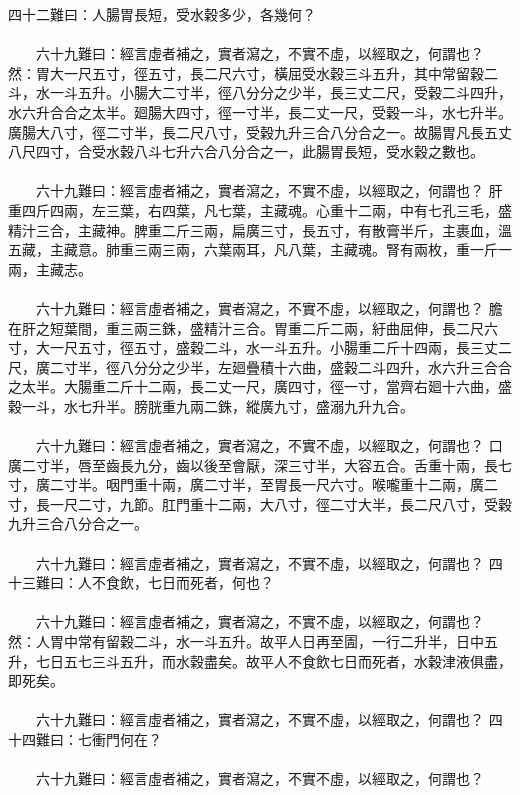 四十二難曰：人腸胃長短，受水穀多少，各幾何？
\\\\
　　六十九難曰：經言虛者補之，實者瀉之，不實不虛，以經取之，何謂也？
然：胃大一尺五寸，徑五寸，長二尺六寸，橫屈受水穀三斗五升，其中常留穀二斗，水一斗五升。小腸大二寸半，徑八分分之少半，長三丈二尺，受穀二斗四升，水六升合合之太半。廻腸大四寸，徑一寸半，長二丈一尺，受穀一斗，水七升半。廣腸大八寸，徑二寸半，長二尺八寸，受穀九升三合八分合之一。故腸胃凡長五丈八尺四寸，合受水穀八斗七升六合八分合之一，此腸胃長短，受水穀之數也。
\\\\
　　六十九難曰：經言虛者補之，實者瀉之，不實不虛，以經取之，何謂也？
肝重四斤四兩，左三葉，右四葉，凡七葉，主藏魂。心重十二兩，中有七孔三毛，盛精汁三合，主藏神。脾重二斤三兩，扁廣三寸，長五寸，有散膏半斤，主裹血，溫五藏，主藏意。肺重三兩三兩，六葉兩耳，凡八葉，主藏魂。腎有兩枚，重一斤一兩，主藏志。
\\\\
　　六十九難曰：經言虛者補之，實者瀉之，不實不虛，以經取之，何謂也？
膽在肝之短葉間，重三兩三銖，盛精汁三合。胃重二斤二兩，紆曲屈伸，長二尺六寸，大一尺五寸，徑五寸，盛穀二斗，水一斗五升。小腸重二斤十四兩，長三丈二尺，廣二寸半，徑八分分之少半，左廻疊積十六曲，盛穀二斗四升，水六升三合合之太半。大腸重二斤十二兩，長二丈一尺，廣四寸，徑一寸，當齊右廻十六曲，盛穀一斗，水七升半。膀胱重九兩二銖，縱廣九寸，盛溺九升九合。
\\\\
　　六十九難曰：經言虛者補之，實者瀉之，不實不虛，以經取之，何謂也？
口廣二寸半，唇至齒長九分，齒以後至會厭，深三寸半，大容五合。舌重十兩，長七寸，廣二寸半。咽門重十兩，廣二寸半，至胃長一尺六寸。喉嚨重十二兩，廣二寸，長一尺二寸，九節。肛門重十二兩，大八寸，徑二寸大半，長二尺八寸，受穀九升三合八分合之一。
\\\\
　　六十九難曰：經言虛者補之，實者瀉之，不實不虛，以經取之，何謂也？
四十三難曰：人不食飲，七日而死者，何也？
\\\\
　　六十九難曰：經言虛者補之，實者瀉之，不實不虛，以經取之，何謂也？
然：人胃中常有留穀二斗，水一斗五升。故平人日再至圊，一行二升半，日中五升，七日五七三斗五升，而水穀盡矣。故平人不食飲七日而死者，水穀津液俱盡，即死矣。
\\\\
　　六十九難曰：經言虛者補之，實者瀉之，不實不虛，以經取之，何謂也？
四十四難曰：七衝門何在？
\\\\
　　六十九難曰：經言虛者補之，實者瀉之，不實不虛，以經取之，何謂也？
